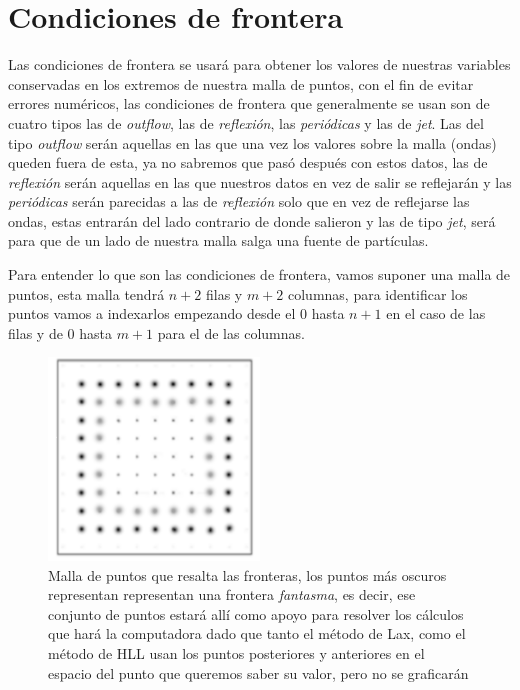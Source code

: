 \documentclass[12pt,a4paper]{book}
\begin{document}
\chapter{Condiciones de frontera} \label{aped.B}


Las condiciones de frontera se usará para obtener los valores de nuestras variables conservadas en los extremos de nuestra malla de puntos, con el fin de evitar errores numéricos, las condiciones de frontera que generalmente se usan son de cuatro tipos las de \textit{outflow}, las de \textit{reflexión}, las \textit{periódicas} y las de \textit{jet}. Las del tipo \textit{outflow} serán aquellas en las que una vez los valores sobre la malla (ondas) queden fuera de esta, ya no sabremos que pasó después con estos datos, las de \textit{reflexión} serán aquellas en las que nuestros datos en vez de salir se reflejarán y las \textit{periódicas} serán parecidas a las de \textit{reflexión} solo que en vez de reflejarse las ondas, estas entrarán del lado contrario de donde salieron  y las de tipo \textit{jet}, será para que de un lado de nuestra malla salga una fuente de partículas.

Para entender lo que son las condiciones de frontera, vamos suponer una malla de puntos, esta malla tendrá $n+2$ filas y $m+2$ columnas, para identificar los puntos vamos a indexarlos empezando desde el 0 hasta $n+1$ en el caso de las filas y de 0 hasta $m+1$ para el de las columnas.

\begin{figure}[H]
\centering
\includegraphics[width=0.5\textwidth]{./Figuras/malla.png}
\caption{Malla de puntos que resalta las fronteras, los puntos más oscuros representan representan una frontera \emph{fantasma}, es decir, ese conjunto de puntos estará allí como apoyo para resolver los cálculos que hará la computadora dado que tanto el método de Lax, como el método de HLL usan los puntos posteriores y anteriores en el espacio del punto que queremos saber su valor, pero no se graficarán} \label{fig: malla de puntos}
\end{figure}
\end{document}
